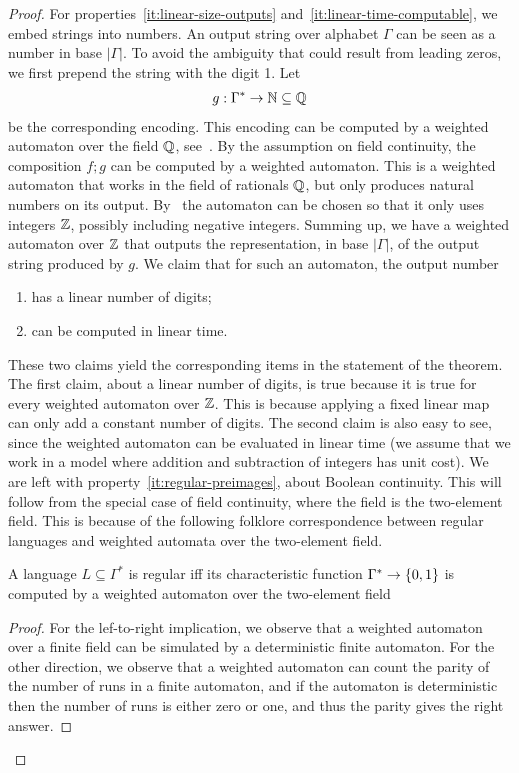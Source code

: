 \begin{proof}
    For properties~\ref{it:linear-size-outputs} and~\ref{it:linear-time-computable}, we embed strings into numbers. 
    An output string over alphabet $\Gamma$ can be seen as a number in base $|\Gamma|$. To avoid the ambiguity that could result from leading zeros, we first prepend the string with the digit 1. Let 
    \begin{align*}
    g : \Gamma^* \to {\mathbb N} \subseteq {\mathbb Q}
    \end{align*} 
    be the corresponding encoding. This encoding can be computed by a weighted automaton over the field ${\mathbb Q}$, see~\cite[Lemma 8.10]{bojanczyk_automata_2025}. By  the assumption on field continuity, the composition $f;g$ can be computed by a weighted automaton. This is a weighted automaton that works in the field of rationals ${\mathbb Q}$, but  only produces natural numbers on its output. By~\cite[p. 110]{BerstelReutenauer08}  the automaton can be chosen so that it only uses  integers ${\mathbb Z}$, possibly including negative integers. Summing up, we have a weighted automaton over ${\mathbb Z}$ that outputs the representation, in base $|\Gamma|$, of the output string produced by $g$. We claim that for such an automaton, the output number
    \begin{enumerate}
        \item has a linear number of digits;
        \item can be computed in linear time.
    \end{enumerate}
    These two claims yield the corresponding items in the statement of the theorem. The first claim, about a linear number of digits, is true because it is true for every weighted automaton over ${\mathbb Z}$. This is because applying a fixed linear map can only add a constant number of digits. The second claim is also easy to see, since the weighted automaton can be evaluated in linear time (we assume that we work in a model where addition and subtraction of integers has unit cost). 
    We are left with property~\ref{it:regular-preimages}, about Boolean continuity.  This will follow from the special case of field continuity, where the field is  the two-element field.  This is because of  the following  folklore correspondence between regular languages and weighted automata over the two-element field. 
        
        \begin{claim}\label{claim:regular-weighted-automata}
            A language $L \subseteq \Gamma^*$ is regular iff its characteristic function $\Gamma^* \to \{0,1\}$ is computed by a weighted automaton over the two-element field 
        \end{claim}
        \begin{proof}
            For the lef-to-right implication, we observe that a weighted automaton over a finite field can be simulated by a deterministic finite automaton. For the other direction, we observe that a weighted automaton can count the parity of  the number of runs in a finite automaton, and if the automaton is deterministic then the number of runs is either zero or one, and thus the parity gives the right answer.
        \end{proof}


\end{proof}
